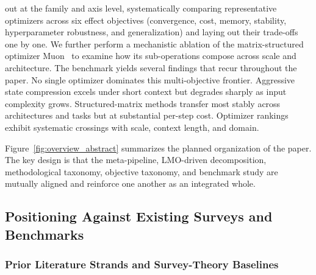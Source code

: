 \begin{enumerate}[leftmargin=*]
  out at the family and axis level, systematically comparing representative
  optimizers across six effect objectives (convergence, cost, memory, stability,
  hyperparameter robustness, and generalization) and laying out their trade-offs
  one by one.  We further perform a mechanistic ablation of the matrix-structured
  optimizer Muon~\cite{jordan2024muon} to examine how its sub-operations compose across scale and
  architecture.  The benchmark yields several findings that recur throughout the
  paper.  No single optimizer dominates this multi-objective frontier.  Aggressive
  state compression excels under short context but degrades sharply as input
  complexity grows.  Structured-matrix methods transfer most stably across
  architectures and tasks but at substantial per-step cost.  Optimizer rankings
  exhibit systematic crossings with scale, context length, and domain.
\end{enumerate}

Figure~\ref{fig:overview_abstract} summarizes the planned organization of
the paper. The key design is that the meta-pipeline, LMO-driven
decomposition, methodological taxonomy, objective taxonomy, and benchmark
study are mutually aligned and reinforce one another as an integrated whole.


\subsection{Positioning Against Existing Surveys and Benchmarks}
\label{sec:intro-positioning}


\subsubsection{Prior Literature Strands and Survey-Theory Baselines}

